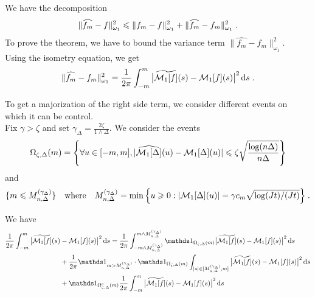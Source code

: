  We have the decomposition
    \begin{equation*}
    \|\widehat{f_m}  - f \|^2 _{\omega_1}
    \leqslant \|f_m  - f \|^2_{\omega_1} + \|\widehat{f_m}  - f_m \|^2_{\omega_1}
    \; .
    \end{equation*}
To prove the theorem, we have to bound the variance term $\|\hat{f_m}  - f_m \|^2_{\omega_1}$. \\
Using the isometry equation, we get 
    \begin{equation*}
    \|\widehat{f_m} - f_m \|^2_{\omega_1}
    = 
   \frac{1}{2\pi} \int_{-m}^m \big|  \widetilde{\mathcal{M}_1[f]}(s) -  \mathcal{M}_1[f](s) \big|^2 \,\mathrm{d} s
   \; .
    \end{equation*}

To get a majorization of the right side term, we consider different events on which it can be control. \\

Fix $\gamma > \zeta$ and set $\gamma_\Delta = \frac{2\zeta}{1 \wedge \Delta}$. We consider the events
\begin{equation*}
    \Omega_{\zeta, \Delta}(m) = \Bigg\{ 
            \forall u \in [-m, m], |\widehat{\mathcal{M}_1[\Delta]}(u) - \mathcal{M}_1[\Delta](u) |
            \leqslant
            \zeta \sqrt{\frac{\log(n \Delta)}{n \Delta}}
        \Bigg\}
\end{equation*}
and
\begin{equation*}
    \{m \leqslant M_{n, \Delta}^{(\gamma_\Delta)}\} 
\quad \text{where} \quad
M_{n, \Delta}^{(\gamma_\Delta)} = \min \Big\{ u \geqslant 0: |\mathcal{M}_1[\Delta](u) | = \gamma c_m \sqrt{\log(Jt)/(Jt)} \Big\}
        \; .
    \end{equation*}

We have
\begin{equation*}
\begin{split}
     \frac{1}{2\pi} \int_{-m}^m \big|  \tilde{\Mcal_1[f]}(s) &-  \Mcal_1[f](s) \big|^2 \diff s
     = 
    \frac{1}{2\pi} \int_{-m \wedge M_{n, \Delta}^{(\gamma_\Delta)}}^{m \wedge M_{n, \Delta}^{(\gamma_\Delta)}} \ind{\Omega_{\zeta, \Delta}(m)} \big|  \tilde{\Mcal_1[f]}(s) -  \Mcal_1[f](s) \big|^2 \diff s
      \\
      &+
    \frac{1}{2\pi} \ind{m > M_{n, \Delta}^{(\gamma_\Delta)}} \cdot \ind{\Omega_{\zeta, \Delta}(m)} \int_{|s| \in [M_{n, \Delta}^{(\gamma_\Delta)}, m ]} \big|  \tilde{\Mcal_1[f]}(s) -  \Mcal_1[f](s) \big|^2 \diff s
    \\ &+
    \ind{\Omega_{\zeta, \Delta}^c(m)} \frac{1}{2\pi} \int_{-m}^m \big|  \tilde{\Mcal_1[f]}(s) -  \Mcal_1[f](s) \big|^2 \diff s
\end{split}
\end{equation*}

